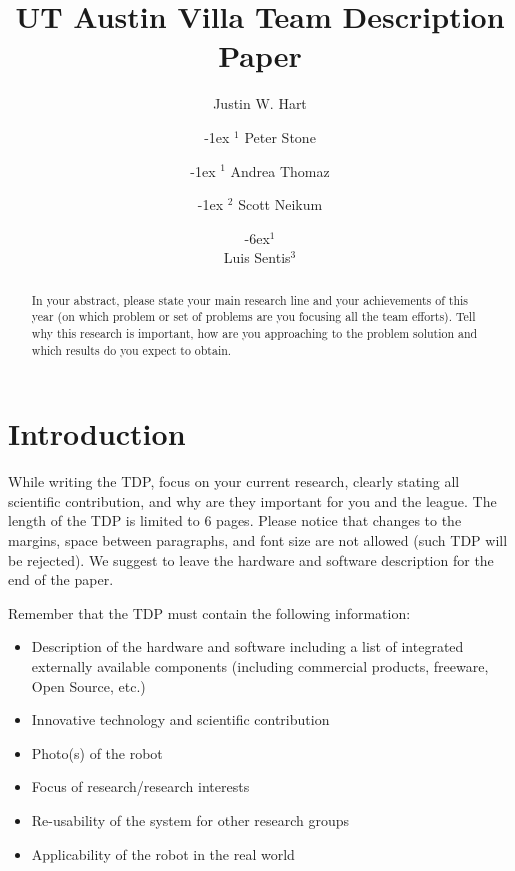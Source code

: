 \documentclass[runningheads,a4paper]{llncs}
\begin{document}
\title{UT Austin Villa Team Description Paper}

\author{Justin W. Hart\and \kern-1ex $^1$ Peter Stone\and \kern-1ex $^1$ Andrea Thomaz\and \kern-1ex $^2$ Scott Neikum\and \kern-6ex$^1$ \\ Luis Sentis$^3$   }
\maketitle



\begin{abstract}

In your abstract, please state your main research line and your achievements of this year (on which problem or set of problems are you focusing all the team efforts). Tell why this research is important, how are you approaching to the problem solution and which results do you expect to obtain.

\end{abstract}



\section{Introduction}
While writing the TDP, focus on your current research, clearly stating all scientific contribution, and why are they important for you and the league. The length of the TDP is limited to 6 pages. Please notice that changes to the margins, space between paragraphs, and font size are not allowed (such TDP will be rejected). We suggest to leave the hardware and software description for the end of the paper.

Remember that the TDP must contain the following information:

\begin{itemize}
	\item Description of the hardware and software including a list of integrated externally available components (including commercial products, freeware, Open Source, etc.)
	\item Innovative technology and scientific contribution
	\item Photo(s) of the robot
	\item Focus of research/research interests
	\item Re-usability of the system for other research groups
	\item Applicability of the robot in the real world
\end{itemize}
\end{document}
